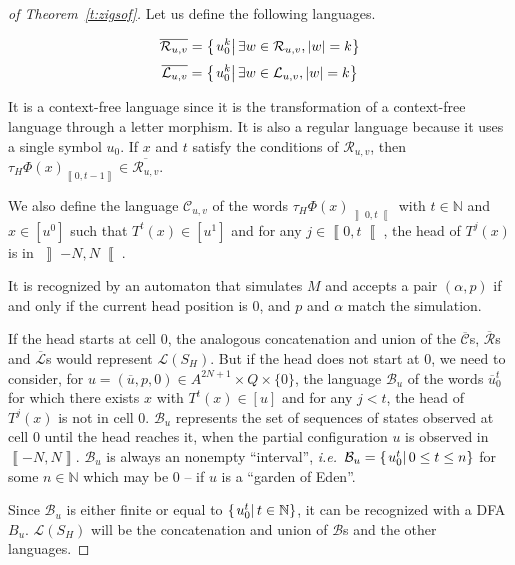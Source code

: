 \documentclass{llncs}
\newcommand{\Nset}{{\mathbb N}}
\newcommand{\lang}{\mathcal L}
\newcommand{\length}[1]{\left|#1\right|}
\newcommand{\co}[2]{\left\llbracket #1,#2\right\llbracket}\newcommand{\cc}[2]{\left\llbracket #1,#2\right\rrbracket}\newcommand{\oo}[2]{\left\rrbracket #1,#2\right\llbracket}\newcommand{\oc}[2]{\left\rrbracket #1,#2\right\rrbracket}\newcommand{\ci}[1]{\co{#1}\infty}\newcommand{\io}[1]{\oo{-\infty}{#1}}\newcommand{\oi}[1]{\oo{#1}\infty}\newcommand{\ic}[1]{\oc{-\infty}{#1}}
\newcommand{\scc}[2]{_{\cc{#1}{#2}}}\newcommand{\sco}[2]{_{\co{#1}{#2}}}\newcommand{\soo}[2]{_{\oo{#1}{#2}}}\newcommand{\soc}[2]{_{\oc{#1}{#2}}}\newcommand{\sci}[1]{_{\ci{#1}}}\newcommand{\sio}[1]{_{\io{#1}}}\newcommand{\soi}[1]{_{\oi{#1}}}\newcommand{\sic}[1]{_{\ic{#1}}}
\newcommand{\sett}[2]{\left\{\left.#1\vphantom{#2}\right|#2\right\}}
\newcommand{\ie}{\textit{i.e.}\ }
\begin{document}
\begin{proof}[of Theorem~\ref{t:zigsof}]
Let us define the following languages.

$$\overline{\mathcal R_{u,v}}=\sett{u_0^k}{\exists w\in \mathcal R_{u,v},\length w=k}$$
$$\overline{\mathcal L_{u,v}}=\sett{u_0^k}{\exists w\in \mathcal L_{u,v},\length w=k}$$

It is a context-free language since it is the transformation of a context-free language through a letter morphism.
It is also a regular language because it uses a single symbol $u_0$.
If $x$ and $t$ satisfy the conditions of $\mathcal R_{u,v}$, then $\tau_H\Phi(x)\scc0{t-1}\in\overline{\mathcal R_{u,v}}$.

We also define the language $\mathcal C_{u,v}$ of the words $\tau_H\Phi(x)\soo0t$ with $t\in\Nset$ and $x\in [u^0]$ such that $T^t(x)\in [u^1]$ and for any $j\in \co0t$, the head of $T^j(x)$ is in $\oo{-N}N$.

It is recognized by an automaton that simulates $M$ and accepts a pair $(\alpha,p)$ if and only if the current head position is $0$, and $p$ and $\alpha$ match the simulation.

If the head starts at cell $0$, the analogous concatenation and union of the $\overline{\mathcal C}$s, $\overline{\mathcal R}$s and $\overline{\mathcal L}$s would represent $\lang(S_H)$. But if the head does not start at $0$, we need to consider, for $u=(\overline{u},p,0)\in A^{2N+1}\times Q\times \{0\}$, the language $\mathcal B_u$ of the words $\overline{u}_0^{t}$ for which there exists $x$ with $T^t(x)\in [u]$ and for any $j<t$, the head of $T^j(x)$ is not in cell $0$.
$\mathcal B_u$ represents the set of sequences of states observed at cell $0$ until the head reaches it, when the partial configuration $u$ is observed in $\cc{-N}N$.
$\mathcal B_u$ is always an nonempty ``interval'', \ie $\mathcal B_u=\sett{u_0^t}{0\le t\le n}$ for some $n\in\Nset$ which may be $0$ -- if $u$ is a ``garden of Eden''.



Since $\mathcal B_u$ is either finite or equal to $\sett{u_0^t}{t\in \Nset}$, it can be recognized with a DFA $B_u$.
$\lang(S_H)$ will be the concatenation and union of $\mathcal B$s and the other languages.


\end{proof}
\end{document}

